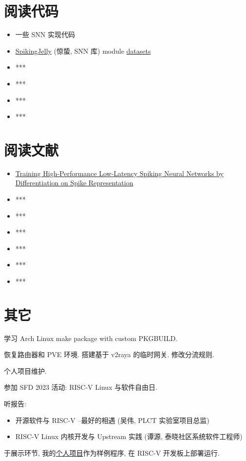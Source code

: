 \documentclass[a4paper]{article}
\begin{document}
\section{阅读代码}

\begin{itemize}
    \item 一些 SNN 实现代码
    \item \href{https://spikingjelly.readthedocs.io}{SpikingJelly} (惊蛰, SNN 库) module \href{https://github.com/fangwei123456/spikingjelly/tree/master/spikingjelly/datasets}{datasets}
    \item ***
    \item ***
    \item ***
    \item ***
\end{itemize}

\section{阅读文献}

\begin{itemize}
    \item \href{https://arxiv.org/abs/2205.00459}{Training High-Performance Low-Latency Spiking Neural Networks by Differentiation on Spike Representation}
    \item ***
    \item ***
    \item ***
    \item ***
    \item ***
    \item ***
\end{itemize}

\section{其它}

学习 Arch Linux make package with custom PKGBUILD.

恢复路由器和 PVE 环境. 搭建基于 v2raya 的临时网关. 修改分流规则.

个人项目维护.

参加 SFD 2023 活动: RISC-V Linux 与软件自由日.

听报告:

\begin{itemize}
    \item 开源软件与 RISC-V --最好的相遇 (吴伟, PLCT 实验室项目总监)
    \item RISC-V Linux 内核开发与 Upstream 实践 (谭源, 泰晓社区系统软件工程师)
\end{itemize}

于展示环节, 我的\href{https://github.com/bad-apple-lab}{个人项目}作为样例程序, 在 RISC-V 开发板上部署运行.
\end{document}
